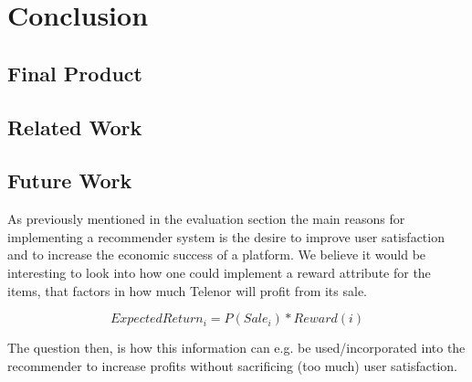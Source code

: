 
\chapter{Conclusion}
\minitoc

\clearpage

\section{Final Product}


\section{Related Work}


\section{Future Work}



As previously mentioned in the evaluation section the main reasons for implementing a recommender
system is the desire to improve user satisfaction and to increase the economic success of a platform.
We believe it would be interesting to look into how one could implement a reward attribute for the
items, that factors in how much Telenor will profit from its sale.

\begin{equation}
ExpectedReturn_i = P(Sale_i) * Reward(i)
\end{equation}

The question then, is how this information can e.g. be used/incorporated into the recommender to
increase profits without sacrificing (too much) user satisfaction.

